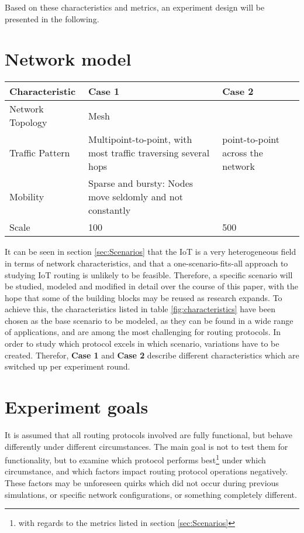 \documentclass{acm_proc_article-sp}
\begin{document}
Based on these characteristics and metrics, an experiment design will be presented in the following.

\section{Network model}
\label{sec:Model}
\begin{table*}[t]
    \begin{tabularx}{\textwidth}{l | X | X  }
      Characteristic & Case 1 & Case 2 \\
      \hline
      Network Topology & Mesh & \\
      Traffic Pattern & Multipoint-to-point, with most traffic traversing several hops & point-to-point across the network \\
      Mobility & Sparse and bursty: Nodes move seldomly and not constantly & \\
      Scale & 100 & 500\\
    \end{tabularx}
    \caption{Characteristics of the modeled network(s)}
    \label{fig:characteristics}
\end{table*}

It can be seen in section \ref{sec:Scenarios} that the IoT is a very heterogeneous field in terms of network characteristics, and that a one-scenario-fits-all approach to studying IoT routing is unlikely to be feasible. Therefore, a specific scenario will be studied, modeled and modified in detail over the course of this paper, with the hope that some of the building blocks may be reused as research expands. To achieve this, the characteristics listed in table \ref{fig:characteristics} have been chosen as the base scenario to be modeled, as they can be found in a wide range of applications, and are among the most challenging for routing protocols.
In order to study which protocol excels in which scenario, variations have to be created. Therefor, \textbf{Case 1} and \textbf{Case 2} describe different characteristics which are switched up per experiment round.


\section{Experiment goals}
\label{sec:Goals}
It is assumed that all routing protocols involved are fully functional, but behave differently under different circumstances. The main goal is not to test them for functionality, but to examine which protocol performs best\footnote{ with regards to the metrics listed in section \ref{sec:Scenarios}} under which circumstance, and which factors impact routing protocol operations negatively. These factors may be unforeseen quirks which did not occur during previous simulations, or specific network configurations, or something completely different.\\
\end{document}
